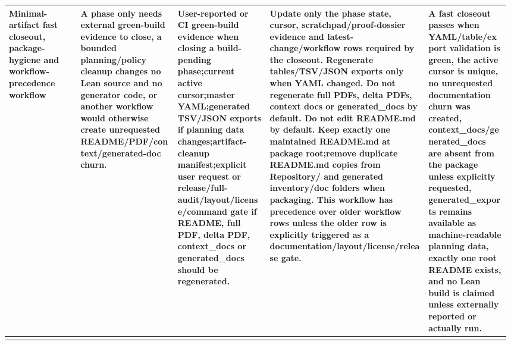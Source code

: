 \begin{longtable}{L{0.14\linewidth} L{0.19\linewidth} L{0.18\linewidth} L{0.31\linewidth} L{0.16\linewidth}}
Minimal-artifact fast closeout, package-hygiene and workflow-precedence workflow & A phase only needs external green-build evidence to close, a bounded planning/\allowbreak{}policy cleanup changes no Lean source and no generator code, or another workflow would otherwise create unrequested README/\allowbreak{}PDF/\allowbreak{}context/\allowbreak{}generated-doc churn. & User-reported or CI green-build evidence when closing a build-pending phase;\newline current active cursor;\newline master YAML;\newline generated TSV/\allowbreak{}JSON exports if planning data changes;\newline artifact-cleanup manifest;\newline explicit user request or release/\allowbreak{}full-audit/\allowbreak{}layout/\allowbreak{}license/\allowbreak{}command gate if README, full PDF, delta PDF, context\_docs or generated\_docs should be regenerated. & Update only the phase state, cursor, scratchpad/\allowbreak{}proof-dossier evidence and latest-change/\allowbreak{}workflow rows required by the closeout. Regenerate tables/\allowbreak{}TSV/\allowbreak{}JSON exports only when YAML changed. Do not regenerate full PDFs, delta PDFs, context docs or generated\_docs by default. Do not edit README.md by default. Keep exactly one maintained README.md at package root;\newline remove duplicate README.md copies from Repository/\allowbreak{} and generated inventory/\allowbreak{}doc folders when packaging. This workflow has precedence over older workflow rows unless the older row is explicitly triggered as a documentation/\allowbreak{}layout/\allowbreak{}license/\allowbreak{}release gate. & A fast closeout passes when YAML/\allowbreak{}table/\allowbreak{}export validation is green, the active cursor is unique, no unrequested documentation churn was created, context\_docs/\allowbreak{}generated\_docs are absent from the package unless explicitly requested, generated\_exports remains available as machine-readable planning data, exactly one root README exists, and no Lean build is claimed unless externally reported or actually run.\\
\hline
\addlinespace[0.24em]
\end{longtable}
\normalsize
